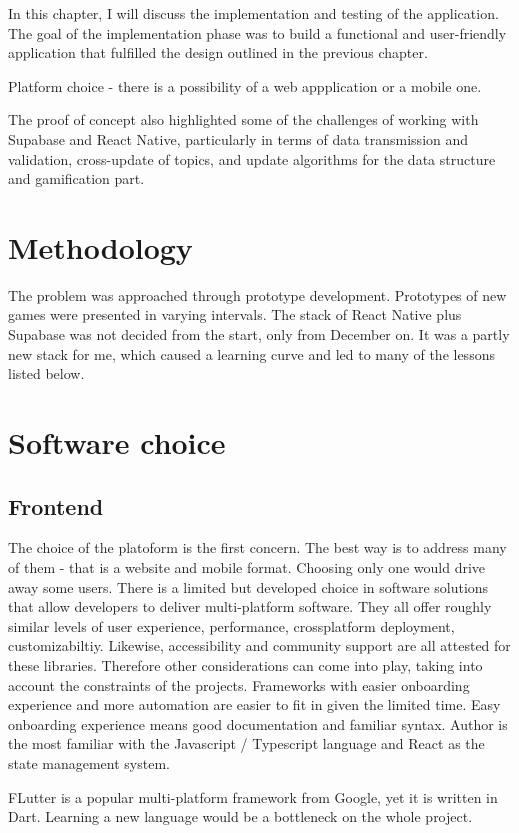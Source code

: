 \documentclass{report}
\begin{document}
In this chapter, I will discuss the implementation and testing of the application. The goal of the implementation phase was to build a functional and user-friendly application that fulfilled the design outlined in the previous chapter.

Platform choice - there is a possibility of a web appplication or a mobile one.

The proof of concept also highlighted some of the challenges of working with Supabase and React Native, particularly in terms of data transmission and validation, cross-update of topics, and update algorithms for the data structure and gamification part.

\section{Methodology}
The problem was approached through prototype development. Prototypes of new games were presented in varying intervals. The stack of React Native plus Supabase was not decided from the start, only from December on. It was a partly new stack for me, which caused a learning curve and led to many of the lessons listed below.

\section{Software choice}

\subsection{Frontend}
The choice of the platoform is the first concern. The best way is to address many of them - that is a website and mobile format. Choosing only one would drive away some users. 
There is a limited but developed choice in software solutions that allow developers to deliver multi-platform software. They all offer roughly similar levels of user experience, performance, crossplatform deployment, customizabiltiy. Likewise, accessibility and community support are all attested for these libraries.
Therefore other considerations can come into play, taking into account the constraints of the projects. Frameworks with easier onboarding experience and more automation are easier to fit in given the limited time. Easy onboarding experience means good documentation and familiar syntax.
Author is the most familiar with the Javascript / Typescript language and React as the state management system.

FLutter is a popular multi-platform framework from Google, yet it is written in Dart. Learning a new language would be a bottleneck on the whole project.
\cite{noauthor_flutter_nodate}
\end{document}
